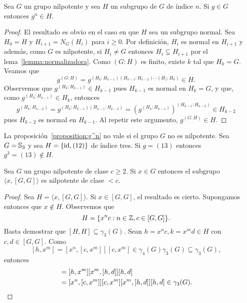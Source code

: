 \begin{proposition}
	\label{proposition:g^n}
	Sea $G$ un grupo nilpotente y sea $H$ un subgrupo de $G$ de índice $n$. Si
	$g\in G$ entonces $g^n\in H$.
\end{proposition}


\begin{proof}
	El resultado es obvio en el caso en que $H$ sea un subgrupo normal.  Sea
	$H_0=H$ y $H_{i+1}=N_G(H_i)$ para $i\geq0$. Por definición, $H_{i}$ es
	normal en $H_{i+1}$ y además, como $G$ es nilpotente, si $H_i\ne G$
	entonces $H_i\subsetneq H_{i+1}$ por el lema~\ref{lemma:normalizadora}.
	Como $(G:H)$ es finito, existe $k$ tal que $H_k=G$. Veamos que 
	\[
		g^{(G:H)}=g^{(H_k:H_{k-1})(H_{k-1}:H_{k-2})\cdots (H_1:H_0)}\in H.
	\]
	Observemos que $g^{(H_k:H_{k-1})}\in H_{k-1}$ pues $H_{k-1}$ es normal en $H_k=G$, y que, como 
	$g^{(H_k:H_{k-1})}\in H_k$, entonces 
	\[
	g^{(H_k:H_{k-2})}=g^{(H_k:H_{k-1})(H_{k-1}:H_{k-2})}=\left(g^{(H_k:H_{k-1})}\right)^{(H_{k-1}:H_{k-2})}\in H_{k-2}
	\]
	pues $H_{k-2}$ es normal en $H_{k-1}$. Al repetir este argumento, $g^{(G:H)}\in H$. 
\end{proof}

\begin{example}
	La proposición~\ref{proposition:g^n} no vale si el grupo $G$ no es
	nilpotente. Sea $G=\mathbb{S}_3$ y sea $H=\{\operatorname{id},(12)\}$ de índice tres.  Si
	$g=(13)$ entonces $g^{3}=(13)\not\in H$.
\end{example}

\begin{lemma}
	\label{lemma:a[GG]}
	Sea $G$ un grupo nilpotente de clase $c\geq2$. Si $x\in G$ entonces el subgrupo 
	$\langle x,[G,G]\rangle$ es nilpotente de clase $<c$.
\end{lemma}

\begin{proof}
	Sea $H=\langle x,[G,G]\rangle$.  Si $x\in [G,G]$, el resultado es cierto.
	Supongamos entonces que $x\not\in H$. Observemos que 
	\[
		H=\{x^nc:n\in\mathbb{Z},c\in [G,G]\}.
	\]
	Basta demostrar que $[H,H]\subseteq\gamma_3(G)$. Sean $h=x^nc,k=x^md\in H$
	con $c,d\in [G,G]$. 
	Como 
	\[
	[h,x^m]=[x^n,[c,x^m]][c,x^m]\in\gamma_4(G)\gamma_3(G)\subseteq\gamma_3(G),
	\]
	entonces 
	\begin{align*}
		[h,k]&=[h,x^m][x^m,[h,d]][h,d]\\
			&=[x^n,[c,x^m]][c,x^m][x^m,[h,d]][h,d]\in\gamma_3(G).\qedhere
	\end{align*}
\end{proof}

